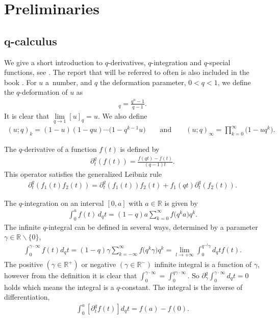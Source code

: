 \documentclass[pdftex]{sigma}
\newcommand{\mR}{\mathbb{R}}
\numberwithin{equation}{section}
\begin{document}
\section{Preliminaries}
\subsection[$q$-calculus]{$\boldsymbol{q}$-calculus}

We give a short introduction to $q$-derivatives, $q$-integration and $q$-special functions, see \cite{MR1052153, JACKSON, Koekoek, MR1448685}. The report \cite{Koekoek} that will be referred to often is also included in the book \cite{MR2656096}. For $u$ a~number, and $q$ the deformation parameter, $0<q<1$, we def\/ine the $q$-deformation of $u$ as
\begin{gather*}
[u]_q=\frac{q^u-1}{q-1}.
\end{gather*}
It is clear that $\lim\limits_{q\to 1}[u]_q=u$. We also def\/ine
\begin{gather*}
(u;q)_k=(1-u)(1-qu)\cdots\big(1-q^{k-1}u\big)\qquad \mbox{and}\qquad (u;q)_\infty=\prod_{k=0}^\infty \big(1-uq^k\big).
\end{gather*}


The $q$-derivative of a function $f(t)$ is def\/ined by
\begin{gather}
\label{qder}
\partial^q_t (f(t)) = \frac{f(qt)-f(t)}{(q-1)t}.
\end{gather}
This operator satisf\/ies the generalized Leibniz rule
\begin{gather}
\label{Leibniz}
\partial_t^q(f_1(t)f_2(t)) = \partial_t^q(f_1(t))f_2(t)+f_1(qt)\partial_t^q(f_2(t)).
\end{gather}


The $q$-integration on an interval $[0,a]$ with $a\in \mR$ is given by
\begin{gather*}
\int_{0}^af(t)\,d_qt = (1-q)a\sum_{k=0}^\infty f\big(q^ka\big)q^k.
\end{gather*}
The inf\/inite $q$-integral can be def\/ined in several ways, determined by a parameter $\gamma\in\mR\backslash \{0\}$,
\begin{gather}
\label{gammaint}
\int_0^{\gamma\cdot\infty}f(t)d_qt = (1-q)\gamma\sum_{k=-\infty}^\infty f\big(q^k\gamma\big)q^k=\lim_{l\to+\infty}\int_0^{q^{-l}\gamma}d_qt f(t).
\end{gather}
The positive $(\gamma\in\mR^+)$ or negative $(\gamma\in\mR^-)$ inf\/inite integral is a function of $\gamma$, however from the def\/inition it is clear that $\int_0^{\gamma\cdot\infty}=\int_0^{q\gamma\cdot \infty}$. So $\partial_\gamma^q\int_0^{\gamma\cdot\infty}d_qt=0$ holds which means the integral is a $q$-constant. The integral is the inverse of dif\/ferentiation,
\begin{gather}
\label{partint1}
\int_0^{a}\left[\partial_t^qf(t)\right]d_qt = f(a)-f(0).
\end{gather}
\end{document}
